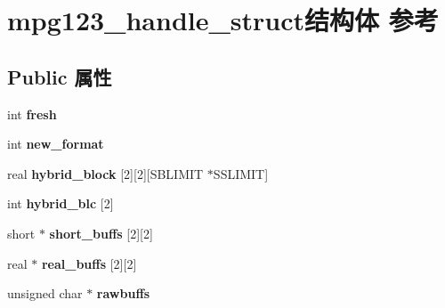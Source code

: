 \hypertarget{structmpg123__handle__struct}{}\section{mpg123\+\_\+handle\+\_\+struct结构体 参考}
\label{structmpg123__handle__struct}
\subsection*{Public 属性}
\begin{DoxyCompactItemize}
\item 
\mbox{\label{structmpg123__handle__struct_a4ff5027e008c0a9f28614ce95097b900}} 
int {\bfseries fresh}
\item 
\mbox{\label{structmpg123__handle__struct_a87458927333d79e7567ee262bc35c218}} 
int {\bfseries new\+\_\+format}
\item 
\mbox{\label{structmpg123__handle__struct_a8885946a31796f5002ae359800703a35}} 
real {\bfseries hybrid\+\_\+block} \mbox{[}2\mbox{]}\mbox{[}2\mbox{]}\mbox{[}S\+B\+L\+I\+M\+IT $\ast$S\+S\+L\+I\+M\+IT\mbox{]}
\item 
\mbox{\label{structmpg123__handle__struct_a857a4b649462e2562b44bf0468c5998a}} 
int {\bfseries hybrid\+\_\+blc} \mbox{[}2\mbox{]}
\item 
\mbox{\label{structmpg123__handle__struct_a275d9a95cb07cfd7f39a3329063abe38}} 
short $\ast$ {\bfseries short\+\_\+buffs} \mbox{[}2\mbox{]}\mbox{[}2\mbox{]}
\item 
\mbox{\label{structmpg123__handle__struct_a00f15c1bc2429773eb5a5f7702e5ab59}} 
real $\ast$ {\bfseries real\+\_\+buffs} \mbox{[}2\mbox{]}\mbox{[}2\mbox{]}
\item 
\mbox{\label{structmpg123__handle__struct_a5ae631d1c9b39fdd2cf9f263dd2f0008}} 
unsigned char $\ast$ {\bfseries rawbuffs}
\item 
\mbox{\label{structmpg123__handle__struct_a8a0339705fe5ac5ae9ff9786a6be667d}} 

\end{DoxyCompactItemize}
